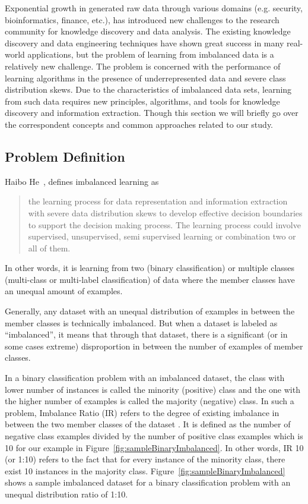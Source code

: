 \label{sec:imbalanceBackground}
Exponential growth in generated raw data through various domains (e.g. security, bioinformatics, 
finance, etc.), has introduced new challenges to the research community for knowledge discovery 
and data analysis. The existing knowledge discovery and data engineering techniques have shown 
great success in many real-world applications, but the problem of learning from imbalanced data 
is a relatively new challenge. The problem is concerned with the performance of learning algorithms 
in the presence of underrepresented data and severe class distribution skews. Due to the 
characteristics of imbalanced data sets, learning from such data requires new principles, 
algorithms, and tools for knowledge discovery and information extraction. Though this section 
we will briefly go over the correspondent concepts and common approaches related to our study.

\subsection{Problem Definition}
Haibo He~\cite{haibo_he_learning_2009}, defines imbalanced learning as 
\begin{quote}
the learning process 
for data representation and information extraction with severe data distribution skews to develop 
effective decision boundaries to support the decision making process. The learning process could 
involve supervised, unsupervised, semi supervised learning or combination two or all of them.
\end{quote}
In other words, it is learning from two (binary classification) or multiple classes (multi-class 
or multi-label classification) of data where the member classes have an unequal amount of examples.

Generally, any dataset with an unequal distribution of examples in between the member classes 
is technically imbalanced. But when a dataset is labeled as “imbalanced”, it means that through 
that dataset, there is a significant (or in some cases extreme) disproportion in between the number 
of examples of member classes.

In a binary classification problem with an imbalanced dataset, the class with lower number of 
instances is called the minority (positive) class and the one with the higher number of examples 
is called the majority (negative) class. In such a problem, Imbalance Ratio (IR) refers to the 
degree of existing imbalance in between the two member classes of the dataset \cite{orriols-puig_evolutionary_2009}. 
It is defined as the number of negative class examples divided by the number of positive class 
examples which is 10 for our example in Figure~\ref{fig:sampleBinaryImbalanced}. In other words, 
IR 10 (or 1:10) refers to the fact that for every instance of the minority class, there exist 10 
instances in the majority class.  Figure~\ref{fig:sampleBinaryImbalanced} shows a sample 
imbalanced dataset for a binary classification problem with an unequal distribution ratio of 1:10.

